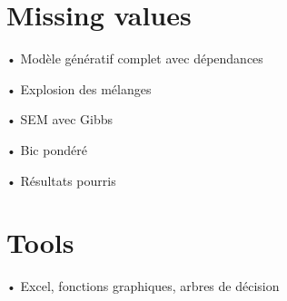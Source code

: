 \documentclass[11pt]{beamer}
\begin{document}
\section{Missing values}
	\begin{frame}{•}
	Modèle génératif complet avec dépendances
	\end{frame}
	\begin{frame}{•}
	Explosion des mélanges 
	\end{frame}
	\begin{frame}{•}
	SEM avec Gibbs 
	\end{frame}
	\begin{frame}{•}
	Bic pondéré 
	\end{frame}
	\begin{frame}{•}
	Résultats pourris 
	\end{frame}
\section{Tools}
	\begin{frame}{•}
		Excel, fonctions graphiques, arbres de décision
	\end{frame}

\begin{frame}

%

\end{frame}
\end{document}
